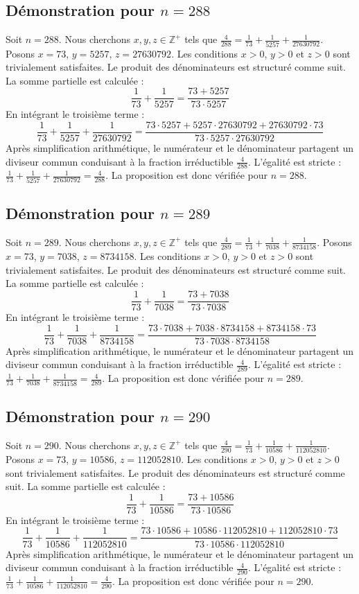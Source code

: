 \documentclass[11pt,a4paper]{article}
\begin{document}
\subsection{Démonstration pour $n = 288$}
Soit $n = 288$. Nous cherchons $x, y, z \in \mathbb{Z}^{+}$ tels que $\frac{4}{288} = \frac{1}{73} + \frac{1}{5257} + \frac{1}{27630792}$.
Posons $x = 73$, $y = 5257$, $z = 27630792$.
Les conditions $x > 0$, $y > 0$ et $z > 0$ sont trivialement satisfaites.
Le produit des dénominateurs est structuré comme suit. La somme partielle est calculée :
$$ \frac{1}{73} + \frac{1}{5257} = \frac{73+5257}{73 \cdot 5257} $$
En intégrant le troisième terme :
$$ \frac{1}{73} + \frac{1}{5257} + \frac{1}{27630792} = \frac{73 \cdot 5257 + 5257 \cdot 27630792 + 27630792 \cdot 73}{73 \cdot 5257 \cdot 27630792} $$
Après simplification arithmétique, le numérateur et le dénominateur partagent un diviseur commun conduisant à la fraction irréductible $\frac{4}{288}$.
L'égalité est stricte : $\frac{1}{73} + \frac{1}{5257} + \frac{1}{27630792} = \frac{4}{288}$.
La proposition est donc vérifiée pour $n = 288$.
\subsection{Démonstration pour $n = 289$}
Soit $n = 289$. Nous cherchons $x, y, z \in \mathbb{Z}^{+}$ tels que $\frac{4}{289} = \frac{1}{73} + \frac{1}{7038} + \frac{1}{8734158}$.
Posons $x = 73$, $y = 7038$, $z = 8734158$.
Les conditions $x > 0$, $y > 0$ et $z > 0$ sont trivialement satisfaites.
Le produit des dénominateurs est structuré comme suit. La somme partielle est calculée :
$$ \frac{1}{73} + \frac{1}{7038} = \frac{73+7038}{73 \cdot 7038} $$
En intégrant le troisième terme :
$$ \frac{1}{73} + \frac{1}{7038} + \frac{1}{8734158} = \frac{73 \cdot 7038 + 7038 \cdot 8734158 + 8734158 \cdot 73}{73 \cdot 7038 \cdot 8734158} $$
Après simplification arithmétique, le numérateur et le dénominateur partagent un diviseur commun conduisant à la fraction irréductible $\frac{4}{289}$.
L'égalité est stricte : $\frac{1}{73} + \frac{1}{7038} + \frac{1}{8734158} = \frac{4}{289}$.
La proposition est donc vérifiée pour $n = 289$.
\subsection{Démonstration pour $n = 290$}
Soit $n = 290$. Nous cherchons $x, y, z \in \mathbb{Z}^{+}$ tels que $\frac{4}{290} = \frac{1}{73} + \frac{1}{10586} + \frac{1}{112052810}$.
Posons $x = 73$, $y = 10586$, $z = 112052810$.
Les conditions $x > 0$, $y > 0$ et $z > 0$ sont trivialement satisfaites.
Le produit des dénominateurs est structuré comme suit. La somme partielle est calculée :
$$ \frac{1}{73} + \frac{1}{10586} = \frac{73+10586}{73 \cdot 10586} $$
En intégrant le troisième terme :
$$ \frac{1}{73} + \frac{1}{10586} + \frac{1}{112052810} = \frac{73 \cdot 10586 + 10586 \cdot 112052810 + 112052810 \cdot 73}{73 \cdot 10586 \cdot 112052810} $$
Après simplification arithmétique, le numérateur et le dénominateur partagent un diviseur commun conduisant à la fraction irréductible $\frac{4}{290}$.
L'égalité est stricte : $\frac{1}{73} + \frac{1}{10586} + \frac{1}{112052810} = \frac{4}{290}$.
La proposition est donc vérifiée pour $n = 290$.
\end{document}
